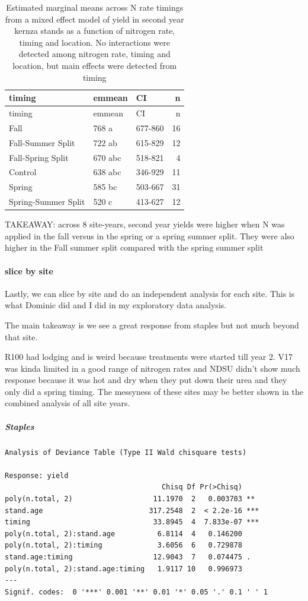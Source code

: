 \documentclass[
  letterpaper,
  DIV=11,
  numbers=noendperiod]{scrartcl}
\let\oldparagraph\paragraph
\renewcommand{\paragraph}[1]{\oldparagraph{#1}\mbox{}}
\let\oldsubparagraph\subparagraph
\renewcommand{\subparagraph}[1]{\oldsubparagraph{#1}\mbox{}}
\begin{document}
\begin{longtable}[]{@{}lllr@{}}
\caption{Estimated marginal means across N rate timings from a mixed
effect model of yield in second year kernza stands as a function of
nitrogen rate, timing and location. No interactions were detected among
nitrogen rate, timing and location, but main effects were detected from
timing}\tabularnewline
\toprule()
timing & emmean & CI & n \\
\midrule()
\endfirsthead
\toprule()
timing & emmean & CI & n \\
\midrule()
\endhead
Fall & 768 a & 677-860 & 16 \\
Fall-Summer Split & 722 ab & 615-829 & 12 \\
Fall-Spring Split & 670 abc & 518-821 & 4 \\
Control & 638 abc & 346-929 & 11 \\
Spring & 585 bc & 503-667 & 31 \\
Spring-Summer Split & 520 c & 413-627 & 12 \\
\bottomrule()
\end{longtable}

TAKEAWAY: across 8 site-years, second year yields were higher when N was
applied in the fall versus in the spring or a spring summer split. They
were also higher in the Fall summer split compared with the spring
summer split

\hypertarget{slice-by-site}{%
\paragraph{slice by site}\label{slice-by-site}}

Lastly, we can slice by site and do an independent analysis for each
site. This is what Dominic did and I did in my exploratory data
analysis.

The main takeaway is we see a great response from staples but not much
beyond that site.

R100 had lodging and is weird because treatments were started till year
2. V17 was kinda limited in a good range of nitrogen rates and NDSU
didn't show much response because it was hot and dry when they put down
their urea and they only did a spring timing. The messyness of these
sites may be better shown in the combined analysis of all site years.

\hypertarget{staples-1}{%
\subparagraph{Staples}\label{staples-1}}

\begin{verbatim}
Analysis of Deviance Table (Type II Wald chisquare tests)

Response: yield
                                     Chisq Df Pr(>Chisq)    
poly(n.total, 2)                   11.1970  2   0.003703 ** 
stand.age                         317.2548  2  < 2.2e-16 ***
timing                             33.8945  4  7.833e-07 ***
poly(n.total, 2):stand.age          6.8114  4   0.146200    
poly(n.total, 2):timing             3.6056  6   0.729878    
stand.age:timing                   12.9043  7   0.074475 .  
poly(n.total, 2):stand.age:timing   1.9117 10   0.996973    
---
Signif. codes:  0 '***' 0.001 '**' 0.01 '*' 0.05 '.' 0.1 ' ' 1
\end{verbatim}
\end{document}
